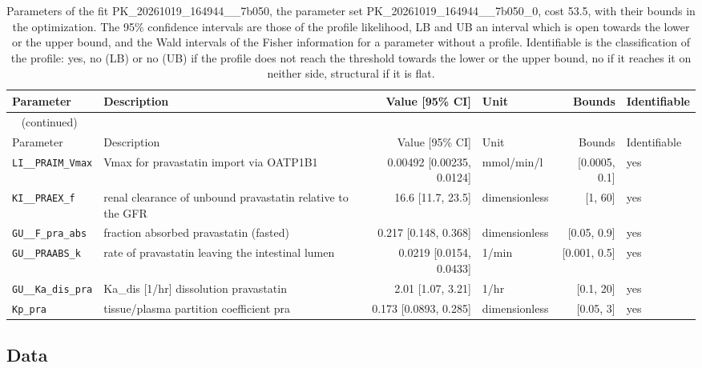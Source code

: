 \begin{longtable}{llrlrl}
\caption{Parameters of the fit PK\_20261019\_164944\_\_7b050, the parameter set PK\_20261019\_164944\_\_7b050\_0, cost 53.5, with their bounds in the optimization. The 95\% confidence intervals are those of the profile likelihood, LB and UB an interval which is open towards the lower or the upper bound, and the Wald intervals of the Fisher information for a parameter without a profile. Identifiable is the classification of the profile: yes, no (LB) or no (UB) if the profile does not reach the threshold towards the lower or the upper bound, no if it reaches it on neither side, structural if it is flat.}\label{tab:parameters:PK_20261019_164944__7b050} \\
\toprule
Parameter & Description & Value [95\% CI] & Unit & Bounds & Identifiable \\
\midrule
\endfirsthead
\multicolumn{6}{l}{\small\tablename~\thetable{} (continued)} \\
\toprule
Parameter & Description & Value [95\% CI] & Unit & Bounds & Identifiable \\
\midrule
\endhead
\bottomrule
\endlastfoot
\texttt{LI\_\_PRAIM\_Vmax} & Vmax for pravastatin import via OATP1B1 & 0.00492 [0.00235, 0.0124] & mmol/min/l & [0.0005, 0.1] & yes \\
\texttt{KI\_\_PRAEX\_f} & renal clearance of unbound pravastatin relative to the GFR & 16.6 [11.7, 23.5] & dimensionless & [1, 60] & yes \\
\texttt{GU\_\_F\_pra\_abs} & fraction absorbed pravastatin (fasted) & 0.217 [0.148, 0.368] & dimensionless & [0.05, 0.9] & yes \\
\texttt{GU\_\_PRAABS\_k} & rate of pravastatin leaving the intestinal lumen & 0.0219 [0.0154, 0.0433] & 1/min & [0.001, 0.5] & yes \\
\texttt{GU\_\_Ka\_dis\_pra} & Ka\_dis [1/hr] dissolution pravastatin & 2.01 [1.07, 3.21] & 1/hr & [0.1, 20] & yes \\
\texttt{Kp\_pra} & tissue/plasma partition coefficient pra & 0.173 [0.0893, 0.285] & dimensionless & [0.05, 3] & yes \\
\end{longtable}

\subsection{Data}

